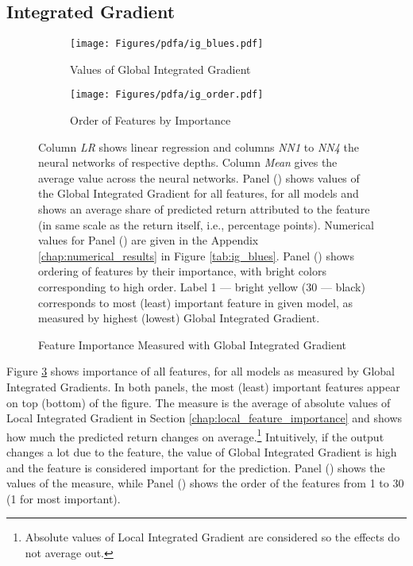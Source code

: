 	\subsection{Integrated Gradient}
	
		\begin{figure}	
			\centering		
			\begin{subfigure}[t]{\textwidth}
				\texttt{[image: Figures/pdfa/ig\_blues.pdf]}
				\caption{Values of Global Integrated Gradient}
				\label{fig:ig_blues}
			\end{subfigure}
			
			\begin{subfigure}[t]{\textwidth}
				\texttt{[image: Figures/pdfa/ig\_order.pdf]}
				\caption{Order of Features by Importance}
				\label{fig:ig_order}
			\end{subfigure}
			\caption{Feature Importance Measured with Global Integrated Gradient}
			\medskip
			\small
			Column \textit{LR} shows linear regression and columns \textit{NN1} to \textit{NN4} the neural networks of respective depths. Column \textit{Mean} gives the average value across the neural networks. Panel () shows values of the Global Integrated Gradient for all features, for all models and shows an average share of predicted return attributed to the feature (in same scale as the return itself, i.e., percentage points).  Numerical values for Panel () are given in the Appendix \ref{chap:numerical_results} in Figure \ref{tab:ig_blues}. Panel () shows ordering of features by their importance, with bright colors corresponding to high order. Label 1 --- bright yellow (30 --- black) corresponds to most (least) important feature in given model, as measured by highest (lowest) Global Integrated Gradient. 
			\label{fig:ig_ensemble}
		\end{figure}
	
	
		Figure \ref{fig:ig_ensemble} shows importance of all features, for all models as measured by Global Integrated Gradients.  In both panels, the most (least) important features appear on top (bottom) of the figure. The measure is the average of absolute values of Local Integrated Gradient in Section \ref{chap:local_feature_importance} and shows how much the predicted return changes on average.\footnote{Absolute values of Local Integrated Gradient are considered so the effects do not average out.} Intuitively, if the output changes a lot due to the feature, the value of Global Integrated Gradient is high and the feature is considered important for the prediction. Panel () shows the values of the measure, while Panel () shows the order of the features from 1 to 30 (1 for most important).
		
